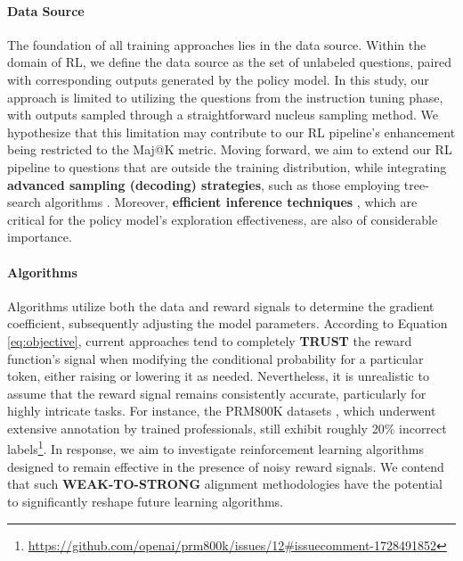 \begin{itemize}[topsep=0pt]
\begin{itemize}[topsep=0pt]
\paragraph{Data Source} The foundation of all training approaches lies in the data source. Within the domain of RL, we define the data source as the set of unlabeled questions, paired with corresponding outputs generated by the policy model. In this study, our approach is limited to utilizing the questions from the instruction tuning phase, with outputs sampled through a straightforward nucleus sampling method. We hypothesize that this limitation may contribute to our RL pipeline's enhancement being restricted to the Maj@K metric. Moving forward, we aim to extend our RL pipeline to questions that are outside the training distribution, while integrating \textbf{advanced sampling (decoding) strategies}, such as those employing tree-search algorithms \citep{yao2023tree}. Moreover, \textbf{efficient inference techniques} \citep{xia-etal-2023-speculative,leviathan2023fast,kwon2023efficient,xia2024unlocking}, which are critical for the policy model's exploration effectiveness, are also of considerable importance.

\paragraph{Algorithms} Algorithms utilize both the data and reward signals to determine the gradient coefficient, subsequently adjusting the model parameters. According to Equation \ref{eq:objective}, current approaches tend to completely \textbf{TRUST} the reward function's signal when modifying the conditional probability for a particular token, either raising or lowering it as needed. Nevertheless, it is unrealistic to assume that the reward signal remains consistently accurate, particularly for highly intricate tasks. For instance, the PRM800K datasets \citep{lightman2023let}, which underwent extensive annotation by trained professionals, still exhibit roughly 20\% incorrect labels\footnote{\url{https://github.com/openai/prm800k/issues/12\#issuecomment-1728491852}}. In response, we aim to investigate reinforcement learning algorithms designed to remain effective in the presence of noisy reward signals. We contend that such \textbf{WEAK-TO-STRONG} \citep{burns2023weak} alignment methodologies have the potential to significantly reshape future learning algorithms.


\end{itemize}
\end{itemize}
